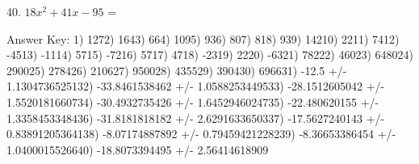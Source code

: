 \documentclass[12pt]{article}
\begin{document}
40. $18x^{2} + 41x -95$ = \underline{\hspace{2 in}}



Answer Key: 1) 127\hspace{.5 in}2) 164\hspace{.5 in}3) 66\hspace{.5 in}4) 109\hspace{.5 in}5) 93\hspace{.5 in}6) 80\hspace{.5 in}7) 81\hspace{.5 in}8) 93\hspace{.5 in}9) 142\hspace{.5 in}10) 22\hspace{.5 in}11) 74\hspace{.5 in}12) -45\hspace{.5 in}13) -11\hspace{.5 in}14) 57\hspace{.5 in}15) -72\hspace{.5 in}16) 57\hspace{.5 in}17) 47\hspace{.5 in}18) -23\hspace{.5 in}19) 22\hspace{.5 in}20) -63\hspace{.5 in}21) 782\hspace{.5 in}22) 460\hspace{.5 in}23) 6480\hspace{.5 in}24) 2900\hspace{.5 in}25) 2784\hspace{.5 in}26) 2106\hspace{.5 in}27) 9500\hspace{.5 in}28) 4355\hspace{.5 in}29) 3904\hspace{.5 in}30) 6966\hspace{.5 in}31) -12.5 +/- 1.13047365251\hspace{.5 in}32) -33.8461538462 +/- 1.05882534495\hspace{.5 in}33) -28.1512605042 +/- 1.55201816607\hspace{.5 in}34) -30.4932735426 +/- 1.64529460247\hspace{.5 in}35) -22.480620155 +/- 1.33584533484\hspace{.5 in}36) -31.8181818182 +/- 2.62916336503\hspace{.5 in}37) -17.5627240143 +/- 0.838912053641\hspace{.5 in}38) -8.07174887892 +/- 0.794594212282\hspace{.5 in}39) -8.36653386454 +/- 1.04000155266\hspace{.5 in}40) -18.8073394495 +/- 2.56414618909\hspace{.5 in}
\end{document}
